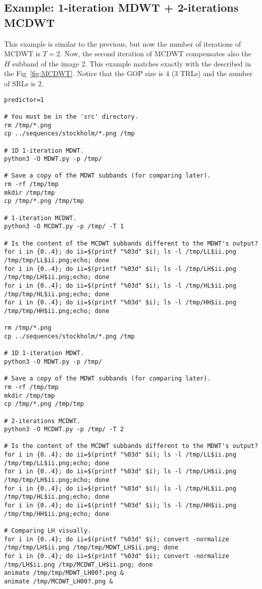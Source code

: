 \subsection*{Example: 1-iteration MDWT + 2-iterations MCDWT}
This example is similar to the previous, but now the number of
iterations of MCDWT is $T=2$. Now, the second iteration of MCDWT
compensates also the $H$ subband of the image 2. This example matches
exactly with the described in the Fig~\ref{fig:MCDWT}. Notice that the
GOP size is $4$ ($3$ TRLs) and the number of SRLs is $2$.

\begin{verbatim}
predictor=1

# You must be in the 'src' directory.
rm /tmp/*.png
cp ../sequences/stockholm/*.png /tmp

# 1D 1-iteration MDWT.
python3 -O MDWT.py -p /tmp/

# Save a copy of the MDWT subbands (for comparing later).
rm -rf /tmp/tmp
mkdir /tmp/tmp
cp /tmp/*.png /tmp/tmp

# 1-iteration MCDWT.
python3 -O MCDWT.py -p /tmp/ -T 1

# Is the content of the MCDWT subbands different to the MDWT's output?
for i in {0..4}; do ii=$(printf "%03d" $i); ls -l /tmp/LL$ii.png /tmp/tmp/LL$ii.png;echo; done
for i in {0..4}; do ii=$(printf "%03d" $i); ls -l /tmp/LH$ii.png /tmp/tmp/LH$ii.png;echo; done
for i in {0..4}; do ii=$(printf "%03d" $i); ls -l /tmp/HL$ii.png /tmp/tmp/HL$ii.png;echo; done
for i in {0..4}; do ii=$(printf "%03d" $i); ls -l /tmp/HH$ii.png /tmp/tmp/HH$ii.png;echo; done

rm /tmp/*.png
cp ../sequences/stockholm/*.png /tmp

# 1D 1-iteration MDWT.
python3 -O MDWT.py -p /tmp/

# Save a copy of the MDWT subbands (for comparing later).
rm -rf /tmp/tmp
mkdir /tmp/tmp
cp /tmp/*.png /tmp/tmp

# 2-iterations MCDWT.
python3 -O MCDWT.py -p /tmp/ -T 2

# Is the content of the MCDWT subbands different to the MDWT's output?
for i in {0..4}; do ii=$(printf "%03d" $i); ls -l /tmp/LL$ii.png /tmp/tmp/LL$ii.png;echo; done
for i in {0..4}; do ii=$(printf "%03d" $i); ls -l /tmp/LH$ii.png /tmp/tmp/LH$ii.png;echo; done
for i in {0..4}; do ii=$(printf "%03d" $i); ls -l /tmp/HL$ii.png /tmp/tmp/HL$ii.png;echo; done
for i in {0..4}; do ii=$(printf "%03d" $i); ls -l /tmp/HH$ii.png /tmp/tmp/HH$ii.png;echo; done

# Comparing LH visually.
for i in {0..4}; do ii=$(printf "%03d" $i); convert -normalize /tmp/tmp/LH$ii.png /tmp/tmp/MDWT_LH$ii.png; done
for i in {0..4}; do ii=$(printf "%03d" $i); convert -normalize /tmp/LH$ii.png /tmp/MCDWT_LH$ii.png; done
animate /tmp/tmp/MDWT_LH00?.png &
animate /tmp/MCDWT_LH00?.png &


\end{verbatim}
